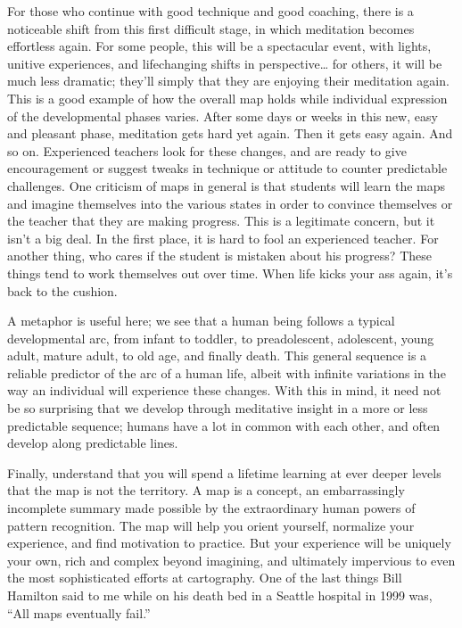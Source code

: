 \documentclass[a5paper,10pt,english]{book}
\begin{document}
\sphinxAtStartPar
For those who continue with good technique and good coaching, there is a
noticeable shift from this first difficult stage, in which meditation
becomes effortless again. For some people, this will be a spectacular
event, with lights, unitive experiences, and life\sphinxhyphen{}changing shifts in
perspective… for others, it will be much less dramatic; they’ll simply
that they are enjoying their meditation again. This is a good example of
how the overall map holds while individual expression of the
developmental phases varies. After some days or weeks in this new, easy
and pleasant phase, meditation gets hard yet again. Then it gets easy
again. And so on. Experienced teachers look for these changes, and are
ready to give encouragement or suggest tweaks in technique or attitude
to counter predictable challenges. One criticism of maps in general is
that students will learn the maps and imagine themselves into the
various states in order to convince themselves or the teacher that they
are making progress. This is a legitimate concern, but it isn’t a big
deal. In the first place, it is hard to fool an experienced teacher. For
another thing, who cares if the student is mistaken about his progress?
These things tend to work themselves out over time. When life kicks your
ass again, it’s back to the cushion.

\sphinxAtStartPar
A metaphor is useful here; we see that a human being follows a typical
developmental arc, from infant to toddler, to pre\sphinxhyphen{}adolescent,
adolescent, young adult, mature adult, to old age, and finally death.
This general sequence is a reliable predictor of the arc of a human
life, albeit with infinite variations in the way an individual will
experience these changes. With this in mind, it need not be so
surprising that we develop through meditative insight in a more or less
predictable sequence; humans have a lot in common with each other, and
often develop along predictable lines.

\sphinxAtStartPar
Finally, understand that you will spend a lifetime learning at ever
deeper levels that the map is not the territory. A map is a concept, an
embarrassingly incomplete summary made possible by the extraordinary
human powers of pattern recognition. The map will help you orient
yourself, normalize your experience, and find motivation to practice.
But your experience will be uniquely your own, rich and complex beyond
imagining, and ultimately impervious to even the most sophisticated
efforts at cartography. One of the last things Bill Hamilton said to me
while on his death bed in a Seattle hospital in 1999 was, “All maps
eventually fail.”
\end{document}
